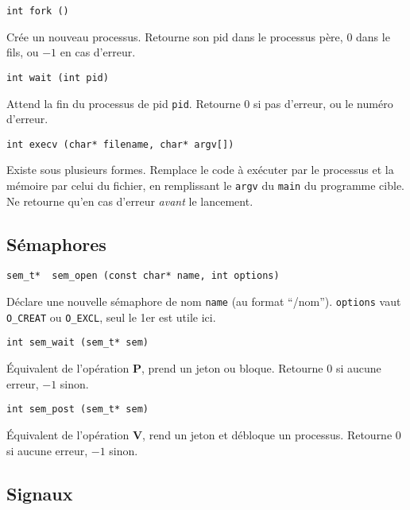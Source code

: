 \documentclass[9pt,a4paper,twocolumn]{article}
\begin{document}
    \begin{lstlisting}
int fork ()
    \end{lstlisting}

    Cr\'ee un nouveau processus.
    Retourne son pid dans le processus p\`ere, $0$ dans le fils, ou $-1$ en cas d'erreur.

    \begin{lstlisting}
int wait (int pid)
    \end{lstlisting}

    Attend la fin du processus de pid \texttt{pid}.
    Retourne 0 si pas d'erreur, ou le num\'ero d'erreur.

    \begin{lstlisting}
int execv (char* filename, char* argv[])
    \end{lstlisting}

    Existe sous plusieurs formes.
    Remplace le code à exécuter par le processus et la mémoire par celui du fichier, en remplissant le \texttt{argv} du \texttt{main} du programme cible.
    Ne retourne qu'en cas d'erreur \emph{avant} le lancement.

    \subsection{Sémaphores}

    \begin{lstlisting}
sem_t*  sem_open (const char* name, int options)
    \end{lstlisting}
    Déclare une nouvelle sémaphore de nom \texttt{name} (au format ``/nom''). 
    \texttt{options} vaut \texttt{O\_CREAT} ou \texttt{O\_EXCL}, seul le 1er est utile ici.


    \begin{lstlisting}
int sem_wait (sem_t* sem)
    \end{lstlisting}
    \'Equivalent de l'opération \textbf{P}, prend un jeton ou bloque.
    Retourne $0$ si aucune erreur, $-1$ sinon.


    \begin{lstlisting}
int sem_post (sem_t* sem)
    \end{lstlisting}
    \'Equivalent de l'opération \textbf{V}, rend un jeton et débloque un processus.
    Retourne $0$ si aucune erreur, $-1$ sinon.

    \subsection{Signaux}
\end{document}
